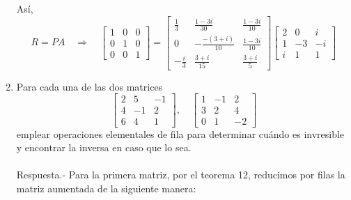 \begin{enumerate}[\bfseries 1.]
	Así,
	$$
	R=PA \quad \Rightarrow \quad
	\left[
	    \begin{array}{rrr}
		1 & 0 & 0\\
		0 & 1 & 0\\
		0 & 0 & 1
	    \end{array}
	\right]
	=
	\left[
	    \begin{array}{rrr}
		    \frac{1}{3} & \frac{1-3i}{30} & \frac{1-3i}{10} \\
		    0 & -\frac{-(3+i)}{10} & \frac{1-3i}{10} \\
		    -\frac{i}{3} & \frac{3+i}{15} & \frac{3+i}{5}
	    \end{array}
	\right]
	\left[
	    \begin{array}{rrr}
	    2 & 0 & i\\
	    1 & -3 & -i\\
	    i & 1 & 1
	    \end{array}
	\right]
	$$
	\vspace{.5cm}

    \item Para cada una de las dos matrices
    $$
    \left[
	\begin{array}{rrr}
	    2 & 5 & -1\\
	    4 & -1 & 2\\
	    6 & 4 & 1
	\end{array} 
    \right],\quad
    \left[
	\begin{array}{rrr}
	    1 & -1 & 2\\
	    3 & 2 & 4\\
	    0 & 1 & -2
	\end{array}
    \right]
    $$
    emplear operaciones elementales de fila para determinar cuándo es invresible y encontrar la inversa en caso que lo sea.\\\\
	Respuesta.-\; Para la primera matriz, por el teorema 12, reducimos por filas la matriz aumentada de la siguiente manera:


\end{enumerate}
